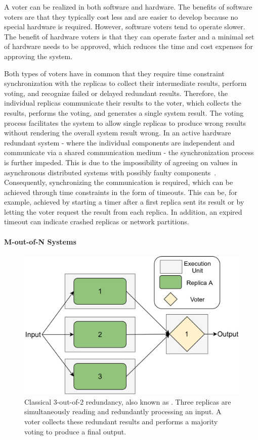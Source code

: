 A voter can be realized in both software and hardware.
The benefits of software voters are that they typically cost less and are easier to develop because no special hardware is required.
However, software voters tend to operate slower.
The benefit of hardware voters is that they can operate faster and a minimal set of hardware needs to be approved, which reduces the time and cost expenses for approving the system.

Both types of voters have in common that they require time constraint synchronization with the replicas to collect their intermediate results, perform voting, and recognize failed or delayed redundant results.
Therefore, the individual replicas communicate their results to the voter, which collects the results, performs the voting, and generates a single system result.
The voting process facilitates the system to allow single replicas to produce wrong results without rendering the overall system result wrong.
In an active hardware redundant system - where the individual components are independent and communicate via a shared communication medium - the synchronization process is further impeded.
This is due to the impossibility of agreeing on values in asynchronous distributed systems with possibly faulty components~\cite{FLPProblemConsensus}.
Consequently, synchronizing the communication is required, which can be achieved through time constraints in the form of timeouts.
This can be, for example, achieved by starting a timer after a first replica sent its result or by letting the voter request the result from each replica.
In addition, an expired timeout can indicate crashed replicas or network partitions.

\paragraph{M-out-of-N Systems}
\begin{figure}[!hb]
	\centering
	\includegraphics[width=0.8\linewidth]{images/Classical2OO3}
	\caption{Classical 3-out-of-2 redundancy, also known as . Three replicas are simultaneously reading and redundantly processing an input. A voter collects these redundant results and performs a majority voting to produce a final output.}
	\label{fig:Classical2OO3}
\end{figure}

